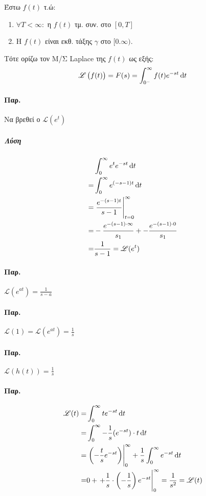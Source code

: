 \documentclass[11pt,a4paper,titlepage,final]{article}
\begin{document}
\begin{defn*}{}
Έστω $f(t)$ τ.ώ:
\begin{enumerate}
\item \(\forall T<\infty: \) η $f(t)$ τμ. συν. στο \([0,T]\)
\item Η $f(t)$ είναι εκθ. τάξης $\gamma$ στο \([0.\infty)\).
\end{enumerate}

Τότε ορίζω τον Μ/Σ \textlatin{Laplace} της $f(t)$ ως εξής:
\[
\mathscr{L}\left(f(t)\right) = F(s)=\int_{0^-}^\infty f(t)e^{-st}\dif t
\]
\end{defn*}

\paragraph{Παρ.}
Να βρεθεί ο $\mathscr{L}(e^t)$
\subparagraph{Λύση}
\begin{align*}
&\int_0^\infty e^te^{-st}\dif t\\
=&\int_0^\infty e^{(-s-1)t} \dif t\\
=& \left. \frac{e^{-(s-1)t}}{s-1}\right|_{t=0}^\infty\\
=&-\frac{e^{-(s-1)\cdot\infty}}{s_1}+-\frac{e^{-(s-1)\cdot0}}{s_1}\\
=&\frac{1}{s-1}=\mathscr{L}(e^t)
\end{align*}

\paragraph{Παρ.}
\(
\mathscr{L}(e^{at}) = \frac{1}{s-a}
\)

\paragraph{Παρ.}
\(
\mathscr{L}(1) = \mathscr{L}(e^{at})=\frac{1}{s}
\)

\paragraph{Παρ.}
\(
\mathscr{L}\left(h(t)\right) = \frac{1}{s}
\)

\paragraph{Παρ.}
\begin{align*}
\mathscr{L}(t)=&\int_0^\infty te^{-st}\dif t
\\=&
\int_0^\infty -\frac{1}{s} (e^{-st})\cdot t \dif t
\\=&
\left.\left( -\frac{t}{s}e^{-st}\right)\right|_0^\infty + \frac{1}{s}\int_0^\infty e^{-st}\dif t
\\=&
0+\left. + \frac{1}{s}\cdot\left(-\frac{1}{s}\right) e^{-st}\right|_0^\infty = \frac{1}{s^2}=\mathscr{L}(t)
\end{align*}
\end{document}
